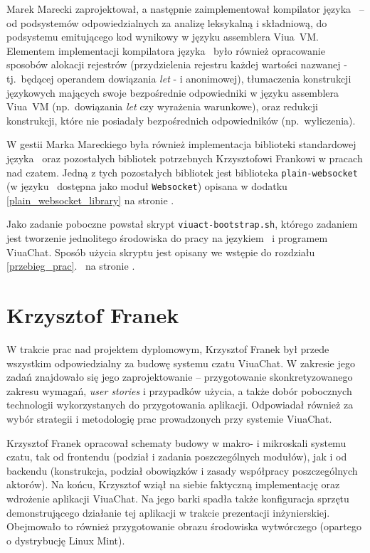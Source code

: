 Marek Marecki zaprojektował, a następnie zaimplementował kompilator języka
\ViuAct\ -- od podsystemów odpowiedzialnych za analizę leksykalną i składniową,
do podsystemu emitującego kod wynikowy w języku assemblera Viua~VM. Elementem
implementacji kompilatora języka \ViuAct\ było również opracowanie sposobów
alokacji rejestrów (przydzielenia rejestru każdej wartości nazwanej -
tj.~będącej operandem dowiązania \emph{let} - i anonimowej), tłumaczenia
konstrukcji językowych mających swoje bezpośrednie odpowiedniki w języku
assemblera Viua~VM (np.~dowiązania \emph{let} czy wyrażenia warunkowe), oraz
redukcji konstrukcji, które nie posiadały bezpośrednich odpowiedników
(np.~wyliczenia).

W gestii Marka Mareckiego była również implementacja biblioteki standardowej
języka \ViuAct\ oraz pozostałych bibliotek potrzebnych Krzysztofowi Frankowi w
pracach nad czatem. Jedną z tych pozostałych bibliotek jest biblioteka
\texttt{plain-websocket} (w języku \ViuAct\ dostępna jako moduł
\texttt{Websocket}) opisana w dodatku \ref{plain_websocket_library} na stronie
\pageref{plain_websocket_library}.

Jako zadanie poboczne powstał skrypt \texttt{viuact-bootstrap.sh}, którego
zadaniem jest tworzenie jednolitego środowiska do pracy na językiem \ViuAct\ i
programem ViuaChat. Sposób użycia skryptu jest opisany we wstępie do rozdziału
\ref{przebieg_prac}.~ na stronie \pageref{przebieg_prac}.

\section{Krzysztof Franek}

W trakcie prac nad projektem dyplomowym, Krzysztof Franek był przede wszystkim
odpowiedzialny za budowę systemu czatu ViuaChat. W zakresie jego zadań znajdowało
się jego zaprojektowanie -- przygotowanie skonkretyzowanego zakresu wymagań,
\textit{user stories} i przypadków użycia, a także dobór pobocznych technologii
wykorzystanych do przygotowania aplikacji. Odpowiadał również za wybór strategii
i metodologię prac prowadzonych przy systemie ViuaChat.

Krzysztof Franek opracował schematy budowy w makro- i mikroskali
systemu czatu, tak od frontendu (podział
i zadania poszczególnych modułów), jak i od backendu (konstrukcja, podział obowiązków
i zasady współpracy poszczególnych aktorów). Na końcu, Krzysztof wziął na siebie
faktyczną implementację oraz wdrożenie aplikacji ViuaChat. Na jego barki spadła
także konfiguracja sprzętu demonstrującego działanie tej aplikacji w trakcie
prezentacji inżynierskiej. Obejmowało to również przygotowanie obrazu środowiska
wytwórczego (opartego o dystrybucję Linux Mint).

